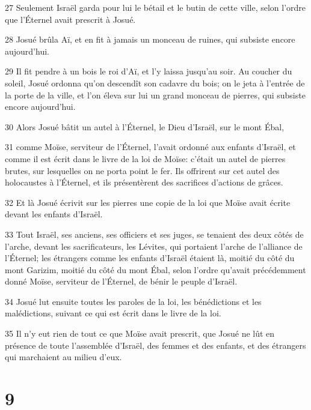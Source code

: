 \par 27 Seulement Israël garda pour lui le bétail et le butin de cette ville, selon l'ordre que l'Éternel avait prescrit à Josué.
\par 28 Josué brûla Aï, et en fit à jamais un monceau de ruines, qui subsiste encore aujourd'hui.
\par 29 Il fit pendre à un bois le roi d'Aï, et l'y laissa jusqu'au soir. Au coucher du soleil, Josué ordonna qu'on descendît son cadavre du bois; on le jeta à l'entrée de la porte de la ville, et l'on éleva sur lui un grand monceau de pierres, qui subsiste encore aujourd'hui.
\par 30 Alors Josué bâtit un autel à l'Éternel, le Dieu d'Israël, sur le mont Ébal,
\par 31 comme Moïse, serviteur de l'Éternel, l'avait ordonné aux enfants d'Israël, et comme il est écrit dans le livre de la loi de Moïse: c'était un autel de pierres brutes, sur lesquelles on ne porta point le fer. Ils offrirent sur cet autel des holocaustes à l'Éternel, et ils présentèrent des sacrifices d'actions de grâces.
\par 32 Et là Josué écrivit sur les pierres une copie de la loi que Moïse avait écrite devant les enfants d'Israël.
\par 33 Tout Israël, ses anciens, ses officiers et ses juges, se tenaient des deux côtés de l'arche, devant les sacrificateurs, les Lévites, qui portaient l'arche de l'alliance de l'Éternel; les étrangers comme les enfants d'Israël étaient là, moitié du côté du mont Garizim, moitié du côté du mont Ébal, selon l'ordre qu'avait précédemment donné Moïse, serviteur de l'Éternel, de bénir le peuple d'Israël.
\par 34 Josué lut ensuite toutes les paroles de la loi, les bénédictions et les malédictions, suivant ce qui est écrit dans le livre de la loi.
\par 35 Il n'y eut rien de tout ce que Moïse avait prescrit, que Josué ne lût en présence de toute l'assemblée d'Israël, des femmes et des enfants, et des étrangers qui marchaient au milieu d'eux.

\chapter{9}

